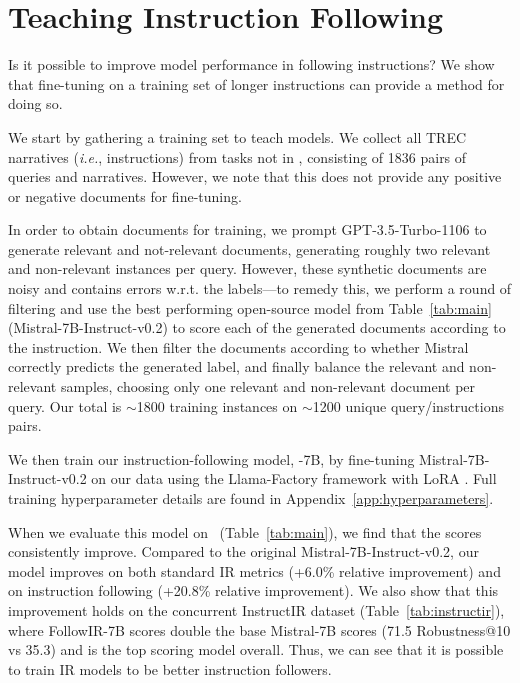 \documentclass{article} %
\begin{document}
\section{Teaching Instruction Following}
\label{sec:model}
Is it possible to improve model performance in following instructions? We show that fine-tuning on a training set of longer instructions can provide a method for doing so. 

We start by gathering a training set to teach models. We collect all TREC narratives (\textit{i.e.}, instructions) from tasks not in \dataset, consisting of 1836 pairs of queries and narratives. However, we note that this does not provide any positive or negative documents for fine-tuning. 


In order to obtain documents for training, we prompt GPT-3.5-Turbo-1106 to generate relevant and not-relevant documents, generating roughly two relevant and non-relevant instances per query. However, these synthetic documents are noisy and contains errors w.r.t. the labels---to remedy this, we perform a round of filtering and use the best performing open-source model from Table~\ref{tab:main} (Mistral-7B-Instruct-v0.2) to score each of the generated documents according to the instruction.  We then filter the documents according to whether Mistral correctly predicts the generated label, and finally balance the relevant and non-relevant samples, choosing only one relevant and non-relevant document per query. Our total is $\sim$1800 training instances on $\sim$1200 unique query/instructions pairs. 

We then train our instruction-following model, \dataset\--7B, by fine-tuning Mistral-7B-Instruct-v0.2 on our data using the Llama-Factory framework \citep{llama-factory} with LoRA \citep{hu2021lora}. Full training hyperparameter details are found in Appendix~\ref{app:hyperparameters}. 




When we evaluate this model on \dataset\ (Table~\ref{tab:main}), we find that the scores consistently improve. Compared to the original Mistral-7B-Instruct-v0.2, our model improves on both standard IR metrics (+6.0\% relative improvement) and on instruction following (+20.8\% relative improvement). We also show that this improvement holds on the concurrent InstructIR dataset (Table~\ref{tab:instructir}), where FollowIR-7B scores double the base Mistral-7B scores (71.5 Robustness@10 vs 35.3) and is the top scoring model overall. Thus, we can see that it is possible to train IR models to be better instruction followers.
\end{document}
